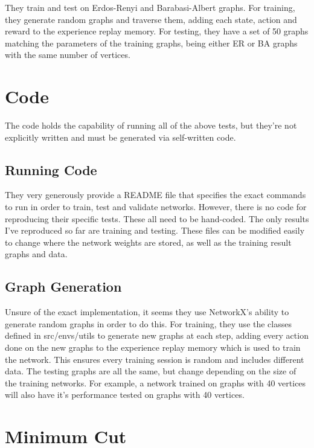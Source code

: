 \documentclass{article}
\begin{document}
They train and test on Erdos-Renyi \cite{erdos} and Barabasi-Albert \cite{albert} graphs. For training, they generate random graphs and traverse them, adding each state, action and reward to the experience replay memory. For testing, they have a set of 50 graphs matching the parameters of the training graphs, being either ER or BA graphs with the same number of vertices.

\section{Code}

The code holds the capability of running all of the above tests, but they're not explicitly written and must be generated via self-written code.

\subsection{Running Code}

They very generously provide a README file that specifies the exact commands to run in order to train, test and validate networks. However, there is no code for reproducing their specific tests. These all need to be hand-coded. The only results I've reproduced so far are training and testing. These files can be modified easily to change where the network weights are stored, as well as the training result graphs and data. 

\subsection{Graph Generation}

Unsure of the exact implementation, it seems they use NetworkX's ability to generate random graphs in order to do this. For training, they use the classes defined in src/envs/utils to generate new graphs at each step, adding every action done on the new graphs to the experience replay memory which is used to train the network. This ensures every training session is random and includes different data. The testing graphs are all the same, but change depending on the size of the training networks. For example, a network trained on graphs with 40 vertices will also have it's performance tested on graphs with 40 vertices. 

\section{Minimum Cut}
\end{document}
